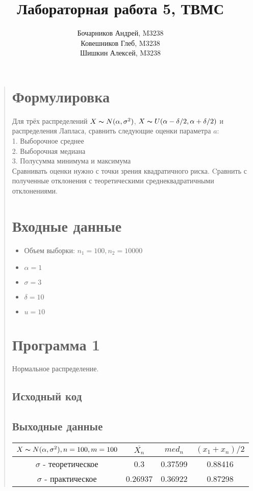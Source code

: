 \documentclass{article}
\begin{document}
\title{Лабораторная работа 5, ТВМС}
\author{
	Бочарников Андрей, M3238\\
	Ковешников Глеб, M3238\\
	Шишкин Алексей, M3238
}
\maketitle

\begin{quote}
\section{Формулировка}
	Для трёх распределений $X \thicksim N(\alpha, \sigma^2)$, $X \thicksim U(\alpha - \delta / 2, \alpha + \delta / 2)$ и распределения Лапласа, сравнить следующие оценки параметра $a$:\\
	1. Выборочное среднее \\
	2. Выборочная медиана \\
	3. Полусумма минимума и максимума \\
	Сравнивать оценки нужно с точки зрения квадратичного риска. Cравнить с полученные отклонения с теоретическими среднеквадратичными отклонениями.
\section{Входные данные}
        \begin{itemize}
            \item Объем выборки: $n_1 = 100, n_2 = 10000$
            \item $\alpha = 1$
	    \item $\sigma = 3$
	    \item $\delta = 10$
	    \item $u = 10$ 
        \end{itemize}
\section{Программа 1}	
        Нормальное распределение. \\
\subsection{Исходный код}
	
\subsection{Выходные данные}
\renewcommand{\arraystretch}{1.8}
\begin{tabular}{ | c | c | c | c | }
\hline
$X \thicksim N(\alpha, \sigma^2), n = 100, m = 100$ & $\overline{X_n}$ & $med_n$ & $(x_1 + x_n) / 2$ \\ \hline
$\sigma$ - теоретическое &  0.3 & 0.37599 & 0.88416 \\ \hline
$\sigma$ - практическое & 0.26937 & 0.36922 & 0.87298 \\
\hline
\end{tabular}


\end{quote}
\end{document}
